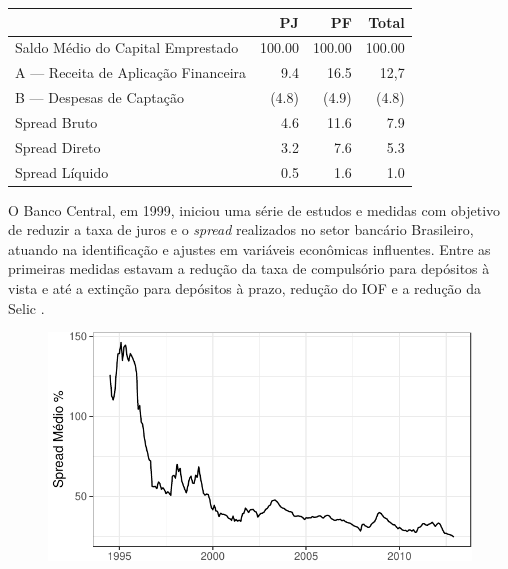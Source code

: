 \documentclass[12pt,12pt,openright,oneside,a4paper,chapter=TITLE,section=TITLE,subsection=TITLE,subsubsection=TITLE,english,french,spanish,portugues,sumario=tradicional]{abntex2}
\begin{document}
\begin{table}[b]
 \centering
    \label{tab:spread.tb}
     \begin{tabular}{l|r|r|r}
      \hline
                                           &   PJ   &   PF    & Total \\
       \hline
       Saldo Médio do Capital Emprestado   & 100.00 & 100.00  & 100.00 \\
       A — Receita de Aplicação Financeira & 9.4    & 16.5    & 12,7   \\
       B — Despesas de Captação            & (4.8)  & (4.9)   & (4.8)  \\   
       Spread Bruto                        & 4.6    & 11.6    & 7.9    \\
       Spread Direto                       & 3.2    & 7.6     & 5.3    \\
       Spread Líquido                      & 0.5    & 1.6     & 1.0    \\
       \hline
       \end{tabular}
\end{table}

O Banco Central, em 1999, iniciou uma série de estudos e medidas com objetivo
de reduzir a taxa de juros e o \emph{spread} realizados no setor bancário
Brasileiro, atuando na identificação e ajustes em variáveis econômicas
influentes. Entre as primeiras medidas estavam a redução da taxa de compulsório
para depósitos à vista e até a extinção para depósitos à prazo, redução do IOF
e a redução da Selic \cite{BCB:2000}.

\begin{figure}

\begin{center}\includegraphics{12-exportedfigures/average spread-1} \end{center}
\label{fig:spread2012}
\end{figure}
\end{document}
